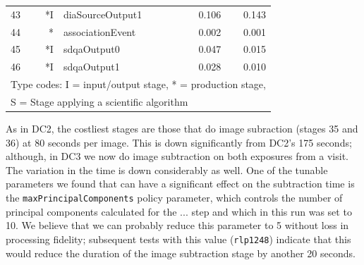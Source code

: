 \begin{table}[p]
\begin{center}
\begin{tabular}{lrlrr}
43 & *I &              diaSourceOutput1 &  0.106 &  0.143 \\
44 & *\phantom{I}  &              associationEvent &  0.002 &  0.001 \\
45 & *I &                   sdqaOutput0 &  0.047 &  0.015 \\
46 & *I &                   sdqaOutput1 &  0.028 &  0.010 \\
\hline
\multicolumn{5}{l}{Type codes: I = input/output stage, * = production stage,} \\
\multicolumn{5}{l}{S = Stage applying a scientific algorithm} \\
\end{tabular}
\end{center}
\end{table}

As in DC2, the costliest stages are those that do image subraction
(stages 35 and 36) at 80 seconds per image.  This is down
significantly from DC2's 175 seconds; although, in DC3 we now do image
subtraction on both exposures from a visit.  The variation in the time
is down considerably as well.  One of the tunable parameters we found
that can have a significant effect on the subtraction time is the 
{\tt maxPrincipalComponents} policy parameter, which controls the number
of principal components calculated for the ... step and which in this
run was set to 10.  We believe that we can probably reduce this
parameter to 5 without loss in processing fidelity; subsequent tests
with this value ({\tt rlp1248}) indicate that this would reduce the
duration of the image subtraction stage by another 20 seconds.

